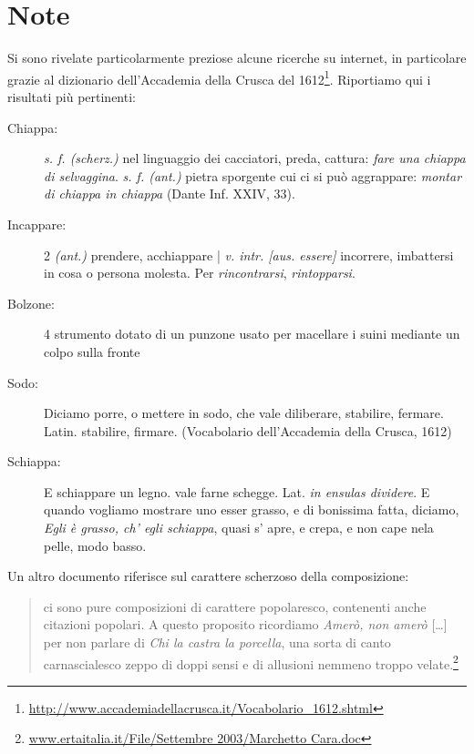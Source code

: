\documentclass[italian,a4paper,10pt]{article}
\newcommand{\crusca}{Vocabolario dell'Accademia della Crusca, 1612}
\begin{document}
\section*{Note}
Si sono rivelate particolarmente preziose alcune ricerche su internet, in particolare grazie al dizionario dell'Accademia della Crusca del 1612\footnote{\url{http://www.accademiadellacrusca.it/Vocabolario_1612.shtml}}. Riportiamo qui i risultati più pertinenti:
\begin{description}
\item[Chiappa:]\emph{ s. f. (scherz.)} nel linguaggio dei cacciatori, preda, cattura: \emph{fare una chiappa di selvaggina}.\emph{ s. f. (ant.)} pietra sporgente cui ci si può aggrappare: \emph{montar di chiappa in chiappa} (Dante Inf. XXIV, 33).
\item[Incappare:] 2 \emph{(ant.)} prendere, acchiappare | \emph{v. intr. [aus. essere]} incorrere, imbattersi in cosa o persona molesta. Per \emph{rincontrarsi}, \emph{rintopparsi}.
\item[Bolzone:]4 strumento dotato di un punzone usato per macellare i suini mediante un colpo sulla fronte
\item[Sodo:]Diciamo porre, o mettere in sodo, che vale diliberare, stabilire, fermare. Latin. stabilire, firmare. (\crusca)
\item[Schiappa:] E schiappare un legno. vale farne schegge. Lat. \emph{in ensulas dividere}. E quando vogliamo mostrare uno esser grasso, e di bonissima fatta, diciamo, \emph{Egli è grasso, ch' egli schiappa}, quasi s' apre, e crepa, e non cape nela pelle, modo basso.
\end{description}
Un altro documento riferisce sul carattere scherzoso della composizione:
\begin{quote}
 ci sono pure composizioni di carattere popolaresco,  contenenti anche citazioni popolari. A questo proposito ricordiamo \emph{Amerò, non amerò} [\dots] per non parlare di \emph{Chi la castra la porcella}, una sorta di canto carnascialesco zeppo di doppi sensi e di allusioni nemmeno troppo velate.\footnote{\url{www.ertaitalia.it/File/Settembre 2003/Marchetto Cara.doc}}
\end{quote}
\end{document}
